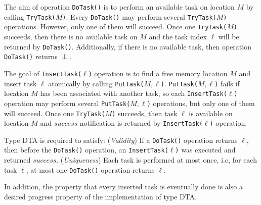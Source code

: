 The aim of operation \texttt{DoTask()} is to perform an available task on location $M$ by calling
\texttt{TryTask(}$M$\texttt{)}. Every \texttt{DoTask()} may perform several \texttt{TryTask(}$M$\texttt{)}
operations. However, only one of them will succeed. Once one \texttt{TryTask(}$M$\texttt{)} succeeds, then
there is no available task on $M$ and the task index $\ell$ will be returned by \texttt{DoTask()}. Additionally,
if there is no available task, then operation \texttt{DoTask()} returns $\perp$.

The goal of \texttt{InsertTask(}$\ell$\texttt{)} operation is to find a free memory location $M$ and insert
task $\ell$ atomically by calling \texttt{PutTask(}$M,\ell$\texttt{)}. \texttt{PutTask(}$M,\ell$\texttt{)}
fails if location $M$ has been associated with another task, so each \texttt{InsertTask(}$\ell$\texttt{)}
operation may perform several \texttt{PutTask(}$M,\ell$\texttt{)} operations, but only one of them will succeed.
Once one \texttt{TryTask(}$M$\texttt{)} succeeds, then task $\ell$ is available on location $M$ and $success$
notification is returned by \texttt{InsertTask(}$\ell$\texttt{)} operation.

Type DTA is required to satisfy: (\emph{Validity}) If a \texttt{DoTask()} operation returns $\ell$, then before the
\texttt{DoTask()} operation, an \texttt{InsertTask(}$\ell$\texttt{)} was executed and returned $success$.
(\emph{Uniqueness}) Each task is performed at most once, i.e, for each task $\ell$, at most one \texttt{DoTask()}
operation returns $\ell$.

In addition, the property that every inserted task is eventually done is also a desired progress property
of the implementation of type DTA.






































%
